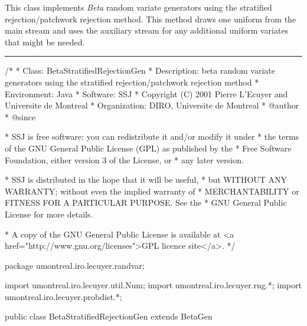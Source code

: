 
This class implements {\em Beta\/} random variate generators using
 the stratified rejection/patch\-work rejection
 method.
 This method draws one uniform from the main stream and uses  the 
auxiliary stream for any additional uniform variates that might be needed.

\bigskip\hrule

\begin{code}
\begin{hide}
/*
 * Class:        BetaStratifiedRejectionGen
 * Description:  beta random variate generators using the stratified 
                 rejection/patchwork rejection method
 * Environment:  Java
 * Software:     SSJ 
 * Copyright (C) 2001  Pierre L'Ecuyer and Universite de Montreal
 * Organization: DIRO, Universite de Montreal
 * @author       
 * @since

 * SSJ is free software: you can redistribute it and/or modify it under
 * the terms of the GNU General Public License (GPL) as published by the
 * Free Software Foundation, either version 3 of the License, or
 * any later version.

 * SSJ is distributed in the hope that it will be useful,
 * but WITHOUT ANY WARRANTY; without even the implied warranty of
 * MERCHANTABILITY or FITNESS FOR A PARTICULAR PURPOSE.  See the
 * GNU General Public License for more details.

 * A copy of the GNU General Public License is available at
   <a href="http://www.gnu.org/licenses">GPL licence site</a>.
 */
\end{hide}
package umontreal.iro.lecuyer.randvar;\begin{hide}
import umontreal.iro.lecuyer.util.Num;
import umontreal.iro.lecuyer.rng.*;
import umontreal.iro.lecuyer.probdist.*;
\end{hide}

public class BetaStratifiedRejectionGen extends BetaGen \begin{hide} {
    
   private RandomStream auxStream;
   private int gen;

   // Parameters for stratified rejection/patchwork rejection
   private static final int b00 = 2;
   private static final int b01 = 3;
   private static final int b01inv = 4;
   private static final int b1prs = 5;
   private double pint;
   private double qint;
   private double p_;
   private double q_;
   private double c;
   private double t;
   private double fp;
   private double fq;
   private double ml;
   private double mu;
   private double p1;
   private double p2;
   private double s;
   private double m;
   private double D;
   private double Dl;
   private double x1;
   private double x2;
   private double x4;
   private double x5;
   private double f1;
   private double f2;
   private double f4;
   private double f5;
   private double ll;
   private double lr;
   private double z2;
   private double z4;
   private double p3;
   private double p4;
\end{hide}
\end{code}

